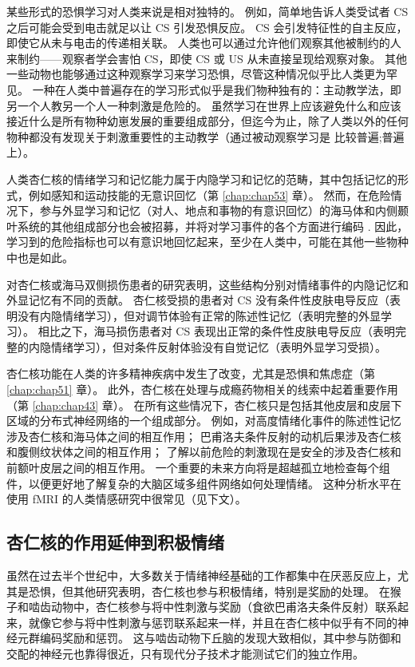 某些形式的恐惧学习对人类来说是相对独特的。 例如，简单地告诉人类受试者 CS 之后可能会受到电击就足以让 CS 引发恐惧反应。 CS 会引发特征性的自主反应，即使它从未与电击的传递相关联。 人类也可以通过允许他们观察其他被制约的人来制约——观察者学会害怕 CS，即使 CS 或 US 从未直接呈现给观察对象。 其他一些动物也能够通过这种观察学习来学习恐惧，尽管这种情况似乎比人类更为罕见。 一种在人类中普遍存在的学习形式似乎是我们物种独有的：主动教学法，即另一个人教另一个人一种刺激是危险的。 虽然学习在世界上应该避免什么和应该接近什么是所有物种幼崽发展的重要组成部分，但迄今为止，除了人类以外的任何物种都没有发现关于刺激重要性的主动教学（通过被动观察学习是 比较普遍;普遍上）。

人类杏仁核的情绪学习和记忆能力属于内隐学习和记忆的范畴，其中包括记忆的形式，例如感知和运动技能的无意识回忆（第 \ref{chap:chap53} 章）。 然而，在危险情况下，参与外显学习和记忆（对人、地点和事物的有意识回忆）的海马体和内侧颞叶系统的其他组成部分也会被招募，并将对学习事件的各个方面进行编码 . 因此，学习到的危险指标也可以有意识地回忆起来，至少在人类中，可能在其他一些物种中也是如此。

对杏仁核或海马双侧损伤患者的研究表明，这些结构分别对情绪事件的内隐记忆和外显记忆有不同的贡献。 杏仁核受损的患者对 CS 没有条件性皮肤电导反应（表明没有内隐情绪学习），但对调节体验有正常的陈述性记忆（表明完整的外显学习）。 相比之下，海马损伤患者对 CS 表现出正常的条件性皮肤电导反应（表明完整的内隐情绪学习），但对条件反射体验没有自觉记忆（表明外显学习受损）。

杏仁核功能在人类的许多精神疾病中发生了改变，尤其是恐惧和焦虑症（第 \ref{chap:chap51} 章）。 此外，杏仁核在处理与成瘾药物相关的线索中起着重要作用（第 \ref{chap:chap43} 章）。 在所有这些情况下，杏仁核只是包括其他皮层和皮层下区域的分布式神经网络的一个组成部分。 例如，对高度情绪化事件的陈述性记忆涉及杏仁核和海马体之间的相互作用； 巴甫洛夫条件反射的动机后果涉及杏仁核和腹侧纹状体之间的相互作用； 了解以前危险的刺激现在是安全的涉及杏仁核和前额叶皮层之间的相互作用。 一个重要的未来方向将是超越孤立地检查每个组件，以便更好地了解复杂的大脑区域多组件网络如何处理情绪。 这种分析水平在使用 fMRI 的人类情感研究中很常见（见下文）。

\subsection{杏仁核的作用延伸到积极情绪}
虽然在过去半个世纪中，大多数关于情绪神经基础的工作都集中在厌恶反应上，尤其是恐惧，但其他研究表明，杏仁核也参与积极情绪，特别是奖励的处理。 在猴子和啮齿动物中，杏仁核参与将中性刺激与奖励（食欲巴甫洛夫条件反射）联系起来，就像它参与将中性刺激与惩罚联系起来一样，并且在杏仁核中似乎有不同的神经元群编码奖励和惩罚。 这与啮齿动物下丘脑的发现大致相似，其中参与防御和交配的神经元也靠得很近，只有现代分子技术才能测试它们的独立作用。

